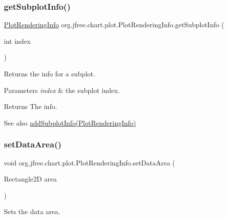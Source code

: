 \subsubsection{\texorpdfstring{get\+Subplot\+Info()}{getSubplotInfo()}}
{\footnotesize\ttfamily \mbox{\hyperlink{classorg_1_1jfree_1_1chart_1_1plot_1_1_plot_rendering_info}{Plot\+Rendering\+Info}} org.\+jfree.\+chart.\+plot.\+Plot\+Rendering\+Info.\+get\+Subplot\+Info (\begin{DoxyParamCaption}\item[{int}]{index }\end{DoxyParamCaption})}

Returns the info for a subplot.


\begin{DoxyParams}{Parameters}
{\em index} & the subplot index.\\
\hline
\end{DoxyParams}
\begin{DoxyReturn}{Returns}
The info.
\end{DoxyReturn}
\begin{DoxySeeAlso}{See also}
\mbox{\hyperlink{classorg_1_1jfree_1_1chart_1_1plot_1_1_plot_rendering_info_a542c06a11a1bd07904e79644745ebb61}{add\+Subplot\+Info(\+Plot\+Rendering\+Info)}} 
\end{DoxySeeAlso}
\mbox{\label{classorg_1_1jfree_1_1chart_1_1plot_1_1_plot_rendering_info_a0b5df4dec91b5707b3571df045d6aee9}} 
\subsubsection{\texorpdfstring{set\+Data\+Area()}{setDataArea()}}
{\footnotesize\ttfamily void org.\+jfree.\+chart.\+plot.\+Plot\+Rendering\+Info.\+set\+Data\+Area (\begin{DoxyParamCaption}\item[{Rectangle2D}]{area }\end{DoxyParamCaption})}

Sets the data area.


